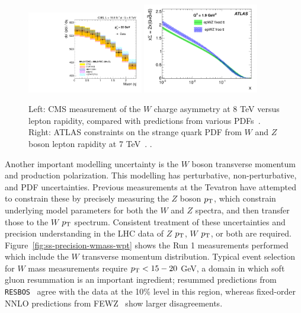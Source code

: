 \begin{figure}[p]
    \centering
    \includegraphics[width=0.45\textwidth]{figures/ss-precision-wmass-wasymmetry.pdf}
    \includegraphics[width=0.45\textwidth]{figures/ss-precision-wmass-wzratio.pdf}
    \caption{
    Left: CMS measurement of the $W$ charge asymmetry at 8 TeV versus lepton
    rapidity, compared with predictions from various PDFs~\cite{Khachatryan:2016pev}.
    Right:  ATLAS constraints on the strange quark PDF from $W$ and $Z$ boson lepton rapidity at 7 TeV~\cite{Aad:2012sb}. 
    .}
    \label{fig:ss-precision-wmass-pdf}
\end{figure}

Another important modelling uncertainty is the $W$ boson transverse
momentum and production polarization.  This modelling has
perturbative, non-perturbative, and PDF uncertainties. Previous
measurements at the Tevatron have attempted to constrain these by
precisely measuring the $Z$ boson $p_{\mathrm{T}}$, which constrain underlying
model parameters for both the $W$ and $Z$ spectra, and then transfer
those to the $W$ $p_{\mathrm{T}}$ spectrum.  Consistent treatment of these
uncertainties and precision understanding in the LHC data of $Z$
$p_{\mathrm{T}}$, $W$ $p_{\mathrm{T}}$, or both are required.
Figure~\ref{fig:ss-precision-wmass-wpt} shows the Run 1 measurements
performed which include the $W$ transverse momentum distribution.
Typical event selection for $W$ mass measurements require $p_{\mathrm{T}} <
15-20$ GeV, a domain in which soft gluon resummation is an important
ingredient; resummed predictions from \texttt{RESBOS}~\cite{resbos}
agree with the data at the 10\% level in this region, whereas
fixed-order NNLO predictions from FEWZ~\cite{FEWZ} show larger
disagreements. 


